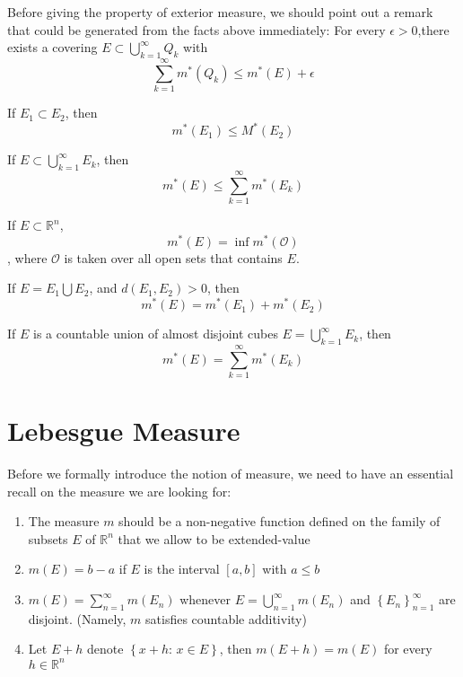\documentclass{ctexbook}
\begin{document}
Before giving the property of exterior measure, we should point out a remark that could be generated from the facts above
immediately: 
For every $\epsilon>0$,there exists a covering $E \subset \bigcup\limits_{k=1}^{\infty}Q_k$ with
\[\sum\limits_{k=1}^{\infty}m^*(Q_k) \leq m^*(E)+\epsilon\]

\begin{prop}[Monotonicity]
    If $E_1 \subset E_2$, then \[m^*(E_1) \leq M^*(E_2)\]
\end{prop}

\begin{prop}
    If $E \subset \bigcup\limits_{k=1}^{\infty}E_k$, then \[m^*(E) \leq \sum\limits_{k=1}^{\infty}m^*(E_k)\]
\end{prop}

\begin{prop}
    \label{sec exterior measure:open set}
    If $E \subset \mathbb{R}^n$, \[m^*(E) = \inf m^*(\mathcal{O} )\], where $\mathcal{O} $ is taken over all open sets
    that contains $E$.
\end{prop}

\begin{prop}
    If $E=E_1\bigcup E_2$, and $d(E_1,E_2) > 0$, then \[m^*(E) = m^*(E_1)+m^*(E_2)\]
\end{prop}

\begin{prop}
    If $E$ is a countable union of almost disjoint cubes $E = \bigcup\limits_{k=1}^{\infty}E_k$, then
    \[m^*(E)=\sum\limits_{k=1}^{\infty}m^*(E_k)\]
\end{prop}

\section{Lebesgue Measure}

Before we formally introduce the notion of measure, we need to have an essential recall on the measure we are looking for:
\begin{enumerate}
    \item The measure $m$ should be a non-negative function defined on the family of subsets $E$ of $\mathbb{R}^n$ that we allow to be extended-value
    \item $m(E)=b-a$ if $E$ is the interval $\left[a,b\right] $ with $a \leq b$
    \item $m(E) = \sum\limits_{n=1}^{\infty}m(E_n)$ whenever $E = \bigcup\limits_{n=1}^{\infty}m(E_n)$ and $\left\{E_n\right\}_{n=1}^{\infty}$ are disjoint. (Namely, $m$ satisfies countable additivity)
    \item Let $E+h$ denote $\left\{x+h:\, x \in E\right\}$, then $m(E+h)=m(E)$ for every $h \in \mathbb{R}^n$
\end{enumerate}
\end{document}
